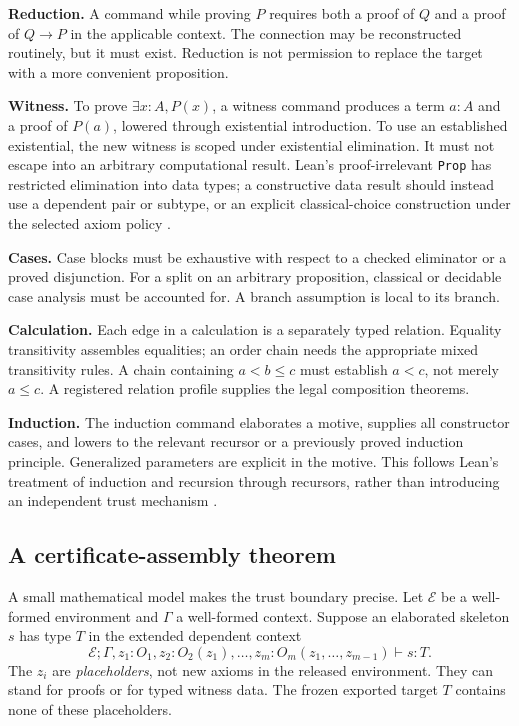 \documentclass[11pt,a4paper]{article}
\newcommand{\EE}{\mathcal E}
\newcommand{\codeid}[1]{\nolinkurl{#1}}
\begin{document}
\textbf{Reduction.} A command \texttt{} while proving $P$ requires both a proof of $Q$ and a proof of $Q\to P$ in the applicable context. The connection may be reconstructed routinely, but it must exist. Reduction is not permission to replace the target with a more convenient proposition.

\textbf{Witness.} To prove $\exists x:A,P(x)$, a witness command produces a term $a:A$ and a proof of $P(a)$, lowered through existential introduction. To use an established existential, the new witness is scoped under existential elimination. It must not escape into an arbitrary computational result. Lean's proof-irrelevant \codeid{Prop} has restricted elimination into data types; a constructive data result should instead use a dependent pair or subtype, or an explicit classical-choice construction under the selected axiom policy \cite{leanprop}.

\textbf{Cases.} Case blocks must be exhaustive with respect to a checked eliminator or a proved disjunction. For a split on an arbitrary proposition, classical or decidable case analysis must be accounted for. A branch assumption is local to its branch.

\textbf{Calculation.} Each edge in a calculation is a separately typed relation. Equality transitivity assembles equalities; an order chain needs the appropriate mixed transitivity rules. A chain containing $a<b\le c$ must establish $a<c$, not merely $a\le c$. A registered relation profile supplies the legal composition theorems.

\textbf{Induction.} The induction command elaborates a motive, supplies all constructor cases, and lowers to the relevant recursor or a previously proved induction principle. Generalized parameters are explicit in the motive. This follows Lean's treatment of induction and recursion through recursors, rather than introducing an independent trust mechanism \cite{leaninductive}.

\subsection{A certificate-assembly theorem}

A small mathematical model makes the trust boundary precise. Let $\EE$ be a well-formed environment and $\Gamma$ a well-formed context. Suppose an elaborated skeleton $s$ has type $T$ in the extended dependent context
\[
 \EE;\Gamma,z_1:O_1,z_2:O_2(z_1),\ldots,
 z_m:O_m(z_1,\ldots,z_{m-1})\vdash s:T.
\]
The $z_i$ are \emph{placeholders}, not new axioms in the released environment. They can stand for proofs or for typed witness data. The frozen exported target $T$ contains none of these placeholders.
\end{document}
